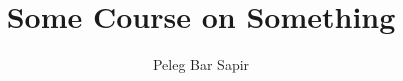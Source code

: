 \documentclass{article}
\title{Some Course on Something}
\author{Peleg Bar Sapir}
\begin{document}
\maketitle

\ifdefined\testcode
  
\else
\fi






\end{document}

